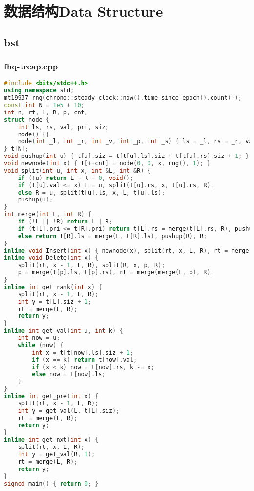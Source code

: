 \documentclass[9pt, a4paper, oneside]{book}
\begin{document}
\chapter{数据结构Data Structure}
\section{bst}
\subsection{fhq-treap.cpp}
\begin{lstlisting}[language={C++}]
#include <bits/stdc++.h>
using namespace std;
mt19937 rng(chrono::steady_clock::now().time_since_epoch().count());
const int N = 1e5 + 10;
int n, rt, L, R, p, cnt;
struct node {
    int ls, rs, val, pri, siz;
    node() {}
    node(int _l, int _r, int _v, int _p, int _s) { ls = _l, rs = _r, val = _v, pri = _p, siz = _s; }
} t[N];
void pushup(int u) { t[u].siz = t[t[u].ls].siz + t[t[u].rs].siz + 1; }
void newnode(int x) { t[++cnt] = node(0, 0, x, rng(), 1); }
void split(int u, int x, int &L, int &R) {
    if (!u) return L = R = 0, void();
    if (t[u].val <= x) L = u, split(t[u].rs, x, t[u].rs, R);
    else R = u, split(t[u].ls, x, L, t[u].ls);
    pushup(u);
}
int merge(int L, int R) {
    if (!L || !R) return L | R;
    if (t[L].pri <= t[R].pri) return t[L].rs = merge(t[L].rs, R), pushup(L), L;
    else return t[R].ls = merge(L, t[R].ls), pushup(R), R;
}
inline void Insert(int x) { newnode(x), split(rt, x, L, R), rt = merge(merge(L, cnt), R); }
inline void Delete(int x) {
    split(rt, x - 1, L, R), split(R, x, p, R);
    p = merge(t[p].ls, t[p].rs), rt = merge(merge(L, p), R);
}
inline int get_rank(int x) {
    split(rt, x - 1, L, R);
    int y = t[L].siz + 1;
    rt = merge(L, R);
    return y;
}
inline int get_val(int u, int k) {
    int now = u;
    while (now) {
        int x = t[t[now].ls].siz + 1;
        if (x == k) return t[now].val;
        if (x < k) now = t[now].rs, k -= x;
        else now = t[now].ls;
    }
}
inline int get_pre(int x) {
    split(rt, x - 1, L, R);
    int y = get_val(L, t[L].siz);
    rt = merge(L, R);
    return y;
}
inline int get_nxt(int x) {
    split(rt, x, L, R);
    int y = get_val(R, 1);
    rt = merge(L, R);
    return y;
}
signed main() { return 0; }\end{lstlisting}
\end{document}
